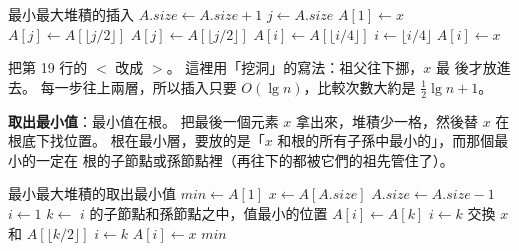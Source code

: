 \begin{pseudo}[label=alg:hp-minmax-insert]{最小最大堆積的插入}
    \State $A.\mathit{size} \gets A.\mathit{size} + 1$
    \State $j \gets A.\mathit{size}$
        \State $A[1] \gets x$
            \State $A[j] \gets A[\lfloor j/2 \rfloor]$ 
            \State {}
        \Else
            \State {}
        \EndIf
    \Else {}
            \State $A[j] \gets A[\lfloor j/2 \rfloor]$ 
            \State {}
        \Else
            \State {}
        \EndIf
    \EndIf
\EndProcedure
\Statex
{} 
        \State $A[i] \gets A[\lfloor i/4 \rfloor]$
        \State $i \gets \lfloor i/4 \rfloor$
    \EndWhile
    \State $A[i] \gets x$
\EndProcedure
\end{pseudo}

 把第 19 行的 $<$ 改成 $>$。 這裡用「挖洞」的寫法：祖父往下挪，$x$ 最
後才放進去。 每一步往上兩層，所以插入只要 $O(\lg n)$，比較次數大約是 $\frac{1}{2}\lg n
+ 1$。

\textbf{取出最小值}：最小值在根。 把最後一個元素 $x$ 拿出來，堆積少一格，然後替 $x$ 在
根底下找位置。 根在最小層，要放的是「$x$ 和根的所有子孫中最小的」，而那個最小的一定在
根的子節點或孫節點裡（再往下的都被它們的祖先管住了）。

\begin{pseudo}[label=alg:hp-minmax-delete]{最小最大堆積的取出最小值}
 
    \State $\mathit{min} \gets A[1]$
    \State $x \gets A[A.\mathit{size}]$
    \State $A.\mathit{size} \gets A.\mathit{size} - 1$
    \State $i \gets 1$
        \State $k \gets$ $i$ 的子節點和孫節點之中，值最小的位置
            \State \Break
        \EndIf
        \State $A[i] \gets A[k]$
            \State $i \gets k$
            \State \Break
        \EndIf
         
            \State 交換 $x$ 和 $A[\lfloor k/2 \rfloor]$
        \EndIf
        \State $i \gets k$
    \EndWhile
        \State $A[i] \gets x$
    \EndIf
    \State \Return $\mathit{min}$
\EndFunction
\end{pseudo}

